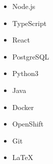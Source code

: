 

\begin{multicols}{5}
	\begin{itemize}
		\item Node.js
		\item TypeScript
		\item React
		\item PostgreSQL
		\item Python3
		\item Java
		\item Docker
		\item OpenShift
		\item Git
		\item LaTeX
	\end{itemize}
\end{multicols}
